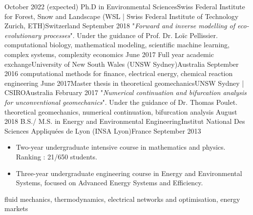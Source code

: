 %
%
%
\begin{experiences}
  \experience
    {October 2022 \hfill (expected)}   {Ph.D in Environmental Sciences}{Swiss Federal Institute for Forest, Snow and Landscape (WSL | Swiss Federal Institute of Technology Zurich, ETH)}{Switzerland}
    {September 2018} {"\textit{Forward and inverse modelling of eco-evolutionary processes}".
                    Under the guidance of Prof. Dr. Loïc Pellissier.
                    }
                    {computational biology, mathematical modeling, scientific machine learning, complex systems, complexity economics}
  \emptySeparator
  \experience
    {June 2017} {Full year academic exchange}{University of New South Wales (UNSW Sydney)}{Australia}
    {September 2016} {}{computational methods for finance, electrical energy, chemical reaction engineering}
  \emptySeparator
  \experience
    {June 2017}{Master thesis in theoretical geomechanics}{UNSW Sydney | CSIRO}{Australia}
    {February 2017}    {"\textit{Numerical continuation and bifurcation analysis for unconventional geomechanics}". Under the guidance of Dr. Thomas Poulet.
                    }
                    {theoretical geomechanics, numerical continuation, bifurcation analysis}
  \emptySeparator
  \experience
  {August 2018}       {B.S./ M.S. in Energy and Environmental Engineering}{Institut National Des Sciences Appliquées de Lyon (INSA Lyon)}{France}
  {September 2013} {
  \begin{itemize}
      \item Two-year undergraduate intensive course in mathematics and physics.
Ranking : 21/650 students.
      \item Three-year undergraduate engineering course in Energy and Environmental Systems, focused on Advanced Energy Systems and Efficiency.
  \end{itemize}
  }{fluid mechanics, thermodynamics, electrical networks and optimisation, energy markets}
\end{experiences}
